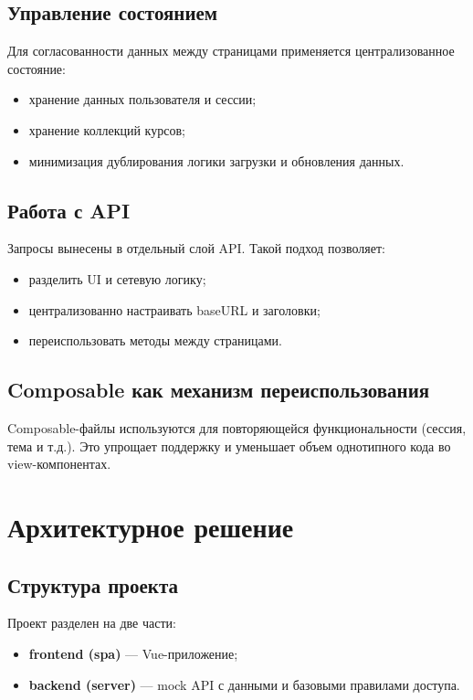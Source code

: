 \documentclass[a4paper,12pt]{article}
\begin{document}
\subsection{Управление состоянием}
Для согласованности данных между страницами применяется централизованное состояние:
\begin{itemize}
    \item хранение данных пользователя и сессии;
    \item хранение коллекций курсов;
    \item минимизация дублирования логики загрузки и обновления данных.
\end{itemize}

\subsection{Работа с API}
Запросы вынесены в отдельный слой API. Такой подход позволяет:
\begin{itemize}
    \item разделить UI и сетевую логику;
    \item централизованно настраивать baseURL и заголовки;
    \item переиспользовать методы между страницами.
\end{itemize}

\subsection{Composable как механизм переиспользования}
Composable-файлы используются для повторяющейся функциональности (сессия, тема и т.д.). Это упрощает поддержку и уменьшает объем однотипного кода во view-компонентах.

\section{Архитектурное решение}
\subsection{Структура проекта}
Проект разделен на две части:
\begin{itemize}
    \item \textbf{frontend (spa)} --- Vue-приложение;
    \item \textbf{backend (server)} --- mock API с данными и базовыми правилами доступа.
\end{itemize}
\end{document}
